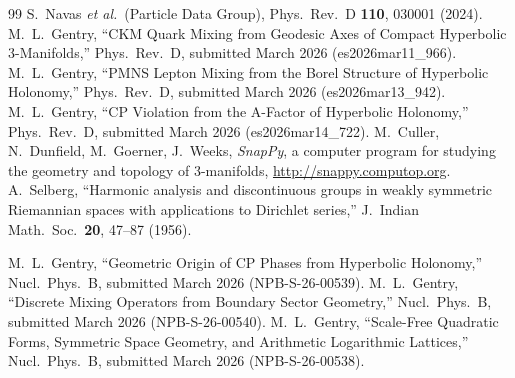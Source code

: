 ﻿\documentclass[aps,prd,twocolumn,longbibliography]{revtex4-2}
\begin{document}
\begin{thebibliography}{99}
  S.~Navas \textit{et al.}\ (Particle Data Group),
  Phys.\ Rev.\ D \textbf{110}, 030001 (2024).
  M.~L.~Gentry,
  ``CKM Quark Mixing from Geodesic Axes of Compact Hyperbolic 3-Manifolds,''
  Phys.\ Rev.\ D, submitted March 2026 (es2026mar11\_966).
  M.~L.~Gentry,
  ``PMNS Lepton Mixing from the Borel Structure of Hyperbolic Holonomy,''
  Phys.\ Rev.\ D, submitted March 2026 (es2026mar13\_942).
  M.~L.~Gentry,
  ``CP Violation from the A-Factor of Hyperbolic Holonomy,''
  Phys.\ Rev.\ D, submitted March 2026 (es2026mar14\_722).
  M.~Culler, N.~Dunfield, M.~Goerner, J.~Weeks,
  \textit{SnapPy}, a computer program for studying the geometry and topology
  of 3-manifolds, \url{http://snappy.computop.org}.
  A.~Selberg,
  ``Harmonic analysis and discontinuous groups in weakly symmetric Riemannian
  spaces with applications to Dirichlet series,''
  J.\ Indian Math.\ Soc.\ \textbf{20}, 47--87 (1956).

  M.~L.~Gentry,
  ``Geometric Origin of CP Phases from Hyperbolic Holonomy,''
  Nucl.\ Phys.\ B, submitted March 2026 (NPB-S-26-00539).
  M.~L.~Gentry,
  ``Discrete Mixing Operators from Boundary Sector Geometry,''
  Nucl.\ Phys.\ B, submitted March 2026 (NPB-S-26-00540).
  M.~L.~Gentry,
  ``Scale-Free Quadratic Forms, Symmetric Space Geometry, and Arithmetic
  Logarithmic Lattices,''
  Nucl.\ Phys.\ B, submitted March 2026 (NPB-S-26-00538).
\end{thebibliography}
\end{document}
